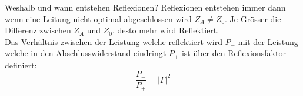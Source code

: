 
\setcounter{CardID}{25}
\begin{karte}{Weshalb und wann entstehen Reflexionen?}
	Reflexionen entstehen immer dann wenn eine Leitung nicht optimal abgeschlossen wird $Z_A \ne Z_0$. Je Grösser die Differenz zwischen $Z_A$ und $Z_0$, desto mehr wird Reflektiert.\\
	Das Verhältnis zwischen der Leistung welche reflektiert wird $P_{-}$ mit der Leistung welche in den Abschlusswiderstand eindringt $P_{+}$ ist über den Reflexionsfaktor definiert:
	\begin{equation*}
		\frac{P_{-}}{P_{+}}=|\Gamma|^{2}
	\end{equation*}
\end{karte}
